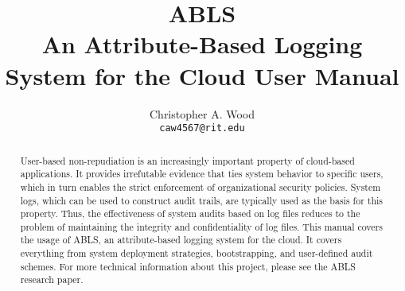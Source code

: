 \documentclass[a4paper,11pt]{report}
\begin{document}
\title{\textbf{ABLS} \\ An Attribute-Based Logging System for the Cloud {\small User Manual}}
\author{Christopher A. Wood \\ {\tt caw4567@rit.edu}}
\maketitle
\begin{abstract}\centering
User-based non-repudiation is an increasingly important property of cloud-based applications. It provides irrefutable evidence that ties system behavior to specific users, which in turn enables the strict enforcement of organizational security policies. System logs, which can be used to construct audit trails, are typically used as the basis for this property. Thus, the effectiveness of system audits based on log files reduces to the problem of maintaining the integrity and confidentiality of log files. This manual covers the usage of ABLS, an attribute-based logging system for the cloud. It covers everything from system deployment strategies, bootstrapping, and user-defined audit schemes. For more technical information about this project, please see the ABLS research paper. 
\end{abstract}
\tableofcontents




{}

\end{document}
